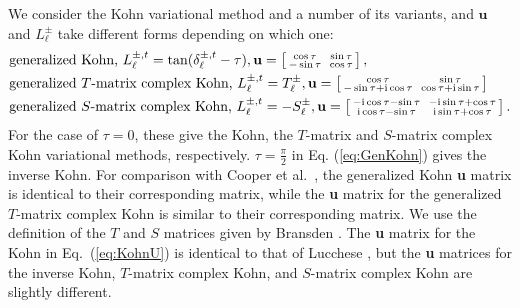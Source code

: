 \documentclass[preprint,showpacs,showkeys,preprintnumbers,amsmath,amssymb,longbibliography,pra,aps]{revtex4-1}
\newcommand{\ii}{{\rm{i}}}
\begin{document}
We consider the Kohn variational method and a number of its variants,
and $\textbf{u}$ and $L^{\pm}_\ell$ take
different forms depending on which one:
\begin{subequations}
\label{eq:KohnU}
\begin{align}
&\text{generalized Kohn, } L^{\pm,t}_\ell = \tan(\delta^{\pm,t}_\ell-\tau),
 \textbf{u} = \left[ \begin{smallmatrix}
\cos \tau & \ \sin \tau \\  -\sin \tau & \  \cos \tau
\end{smallmatrix} \right], \label{eq:GenKohn}\\
&\text{generalized $T$-matrix complex Kohn, } L^{\pm,t}_\ell = T_\ell^{\pm},
 \textbf{u} = \left[ \begin{smallmatrix}
\cos\tau & \ \sin\tau \\ -\sin\tau + \ii \cos\tau & \ \cos\tau + \ii \sin\tau
\end{smallmatrix} \right] \label{eq:GenTKohn} \\
&\text{generalized $S$-matrix complex Kohn, } L^{\pm,t}_\ell = -S_\ell^{\pm},
 \textbf{u} = \left[ \begin{smallmatrix}
-\ii \cos\tau - \sin\tau & \ -\ii\sin\tau + \cos\tau \\ 
 \ii\cos\tau - \sin\tau & \ \ii\sin\tau + \cos\tau
\end{smallmatrix} \right]. \label{eq:GenSKohn}
\end{align}
\end{subequations}
For the case of $\tau = 0$, these give the Kohn, the $T$-matrix and
$S$-matrix complex Kohn variational methods, respectively.
$\tau = \frac{\pi}{2}$ in Eq. (\ref{eq:GenKohn})
gives the inverse Kohn. 
For comparison with Cooper et al.\ \cite{Cooper2010}, the generalized
Kohn \textbf{u} matrix is identical to their corresponding matrix,
while the \textbf{u} matrix for the generalized $T$-matrix complex Kohn
is similar to their corresponding matrix.
We use the definition of the $T$ and $S$ matrices
given by Bransden \cite{Bransden1970}.
The \textbf{u} matrix for the Kohn in Eq.~(\ref{eq:KohnU}) is identical
to that of Lucchese \cite{Lucchese1989}, but the \textbf{u} matrices for
the inverse Kohn, $T$-matrix complex Kohn, and $S$-matrix
complex Kohn are slightly different.
\end{document}
